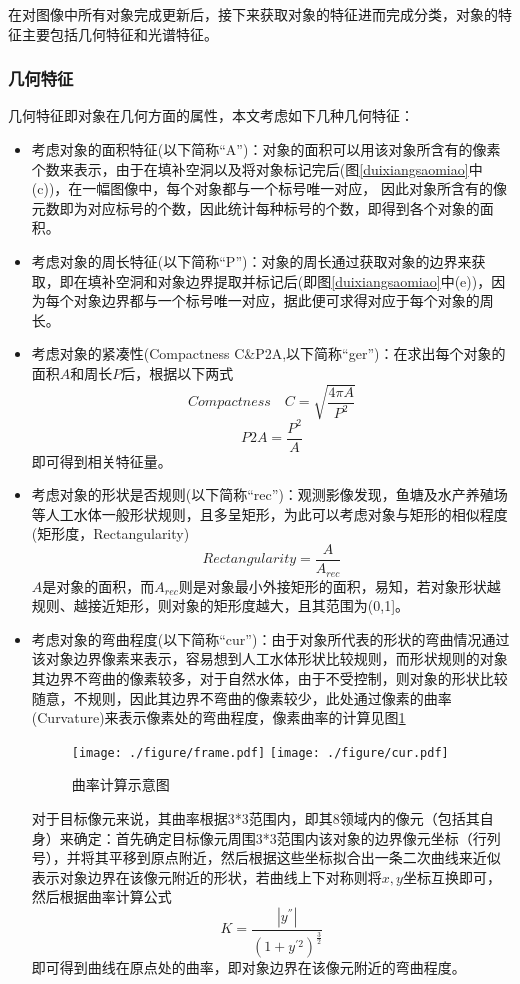 \documentclass[supercite]{upcthesis}
\begin{document}
在对图像中所有对象完成更新后，接下来获取对象的特征进而完成分类，对象的特征主要包括几何特征和光谱特征。
\subsubsection{几何特征}
几何特征即对象在几何方面的属性，本文考虑如下几种几何特征：
\begin{itemize}
\item 考虑对象的面积特征(以下简称“A”)：对象的面积可以用该对象所含有的像素个数来表示，由于在填补空洞以及将对象标记完后(图\ref{duixiangsaomiao}中(c))，在一幅图像中，每个对象都与一个标号唯一对应， 因此对象所含有的像元数即为对应标号的个数，因此统计每种标号的个数，即得到各个对象的面积。
\item 考虑对象的周长特征(以下简称“P”)：对象的周长通过获取对象的边界来获取，即在填补空洞和对象边界提取并标记后(即图\ref{duixiangsaomiao}中(e))，因为每个对象边界都与一个标号唯一对应，据此便可求得对应于每个对象的周长。
\item 考虑对象的紧凑性(Compactness C\&P2A\cite{Montero2009State},以下简称“ger”)：在求出每个对象的面积$A$和周长$P$后，根据以下两式
\begin{equation}
Compactness \quad C =\sqrt{\frac{4\pi A}{P^2}}
\end{equation}
\begin{equation}
P2A=\frac{P^2}{A}
\end{equation}
即可得到相关特征量。
\item 考虑对象的形状是否规则(以下简称“rec”)：观测影像发现，鱼塘及水产养殖场等人工水体一般形状规则，且多呈矩形，为此可以考虑对象与矩形的相似程度(矩形度，Rectangularity)
\begin{equation}
Rectangularity=\frac{A}{A_{rec}}
\end{equation}
$A$是对象的面积，而$A_{rec}$则是对象最小外接矩形的面积，易知，若对象形状越规则、越接近矩形，则对象的矩形度越大，且其范围为(0,1]。
\item 考虑对象的弯曲程度(以下简称“cur”)：由于对象所代表的形状的弯曲情况通过该对象边界像素来表示，容易想到人工水体形状比较规则，而形状规则的对象其边界不弯曲的像素较多，对于自然水体，由于不受控制，则对象的形状比较随意，不规则，因此其边界不弯曲的像素较少，此处通过像素的曲率(Curvature)来表示像素处的弯曲程度，像素曲率的计算见图\ref{cur_frame}
\begin{figure}[htbp]
\centering
\texttt{[image: ./figure/frame.pdf]}
\texttt{[image: ./figure/cur.pdf]}	
\caption{曲率计算示意图}
\label{cur_frame}
\end{figure}
对于目标像元来说，其曲率根据3*3范围内，即其8领域内的像元（包括其自身）来确定：首先确定目标像元周围3*3范围内该对象的边界像元坐标（行列号），并将其平移到原点附近，然后根据这些坐标拟合出一条二次曲线来近似表示对象边界在该像元附近的形状，若曲线上下对称则将$x,y$坐标互换即可，然后根据曲率计算公式
\begin{equation}
K=\frac{|y^{''}|}{(1+y^{'2})^{\frac{3}{2}}}
\end{equation}
即可得到曲线在原点处的曲率，即对象边界在该像元附近的弯曲程度。


\end{itemize}
\end{document}

